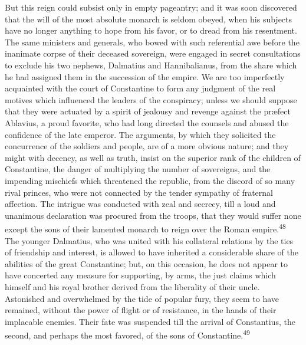 

But this reign could subsist only in empty pageantry; and it was
soon discovered that the will of the most absolute monarch is
seldom obeyed, when his subjects have no longer anything to hope
from his favor, or to dread from his resentment. The same
ministers and generals, who bowed with such referential awe
before the inanimate corpse of their deceased sovereign, were
engaged in secret consultations to exclude his two nephews,
Dalmatius and Hannibalianus, from the share which he had assigned
them in the succession of the empire. We are too imperfectly
acquainted with the court of Constantine to form any judgment of
the real motives which influenced the leaders of the conspiracy;
unless we should suppose that they were actuated by a spirit of
jealousy and revenge against the præfect Ablavius, a proud
favorite, who had long directed the counsels and abused the
confidence of the late emperor. The arguments, by which they
solicited the concurrence of the soldiers and people, are of a
more obvious nature; and they might with decency, as well as
truth, insist on the superior rank of the children of
Constantine, the danger of multiplying the number of sovereigns,
and the impending mischiefs which threatened the republic, from
the discord of so many rival princes, who were not connected by
the tender sympathy of fraternal affection. The intrigue was
conducted with zeal and secrecy, till a loud and unanimous
declaration was procured from the troops, that they would suffer
none except the sons of their lamented monarch to reign over the
Roman empire.\textsuperscript{48} The younger Dalmatius, who was united with his
collateral relations by the ties of friendship and interest, is
allowed to have inherited a considerable share of the abilities
of the great Constantine; but, on this occasion, he does not
appear to have concerted any measure for supporting, by arms, the
just claims which himself and his royal brother derived from the
liberality of their uncle. Astonished and overwhelmed by the tide
of popular fury, they seem to have remained, without the power of
flight or of resistance, in the hands of their implacable
enemies. Their fate was suspended till the arrival of
Constantius, the second, and perhaps the most favored, of the
sons of Constantine.\textsuperscript{49}

